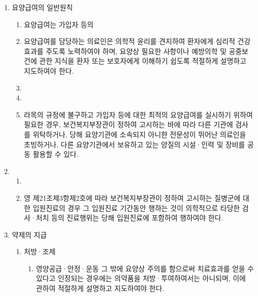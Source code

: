 \begin{enumerate}[1.]\tightlist
\item 요양급여의 일반원칙
	\begin{enumerate}[가.]\tightlist
	\item  요양급여는 가입자 등의 
	\item  요양급여를 담당하는 의료인은 의학적 윤리를 견지하여 환자에게 심리적 건강효과를 주도록 노력하여야 하며, 요양상 필요한 사항이나 예방의학 및 공중보건에 관한 지식을 환자 또는 보호자에게 이해하기 쉽도록 적절하게 설명하고 지도하여야 한다.
	\item  {}
	\item  {}
	\item  라목의 규정에 불구하고 가입자 등에 대한 최적의 요양급여를 실시하기 위하여 필요한 경우, 보건복지부장관이 정하여 고시하는 바에 따라 다른 기관에 검사를 위탁하거나, 당해 요양기관에 소속되지 아니한 전문성이 뛰어난 의료인을 초빙하거나, 다른 요양기관에서 보유하고 있는 양질의 시설·인력 및 장비를 공동 활용할 수 있다.
	\end{enumerate}
\item {}
	\begin{enumerate}[가.]\tightlist
	\item  {}
	\item  영 제21조제3항제2호에 따라 보건복지부장관이 정하여 고시하는 질병군에 대한 입원진료의 경우 그 입원진료 기간동안 행하는 것이 의학적으로 타당한 검사·처치 등의 진료행위는 당해 입원진료에 포함하여 행하여야 한다.
	\end{enumerate}
\item 약제의 지급 
	\begin{enumerate}[가.]\tightlist
	\item  처방·조제
		\begin{enumerate}[(1)]\tightlist
		\item 영양공급·안정·운동 그 밖에 요양상 주의를 함으로써 치료효과를 얻을 수 있다고 인정되는 경우에는 의약품을 처방·투여하여서는 아니되며, 이에 관하여 적절하게 설명하고 지도하여야 한다.

\end{enumerate}
\end{enumerate}
\end{enumerate}
